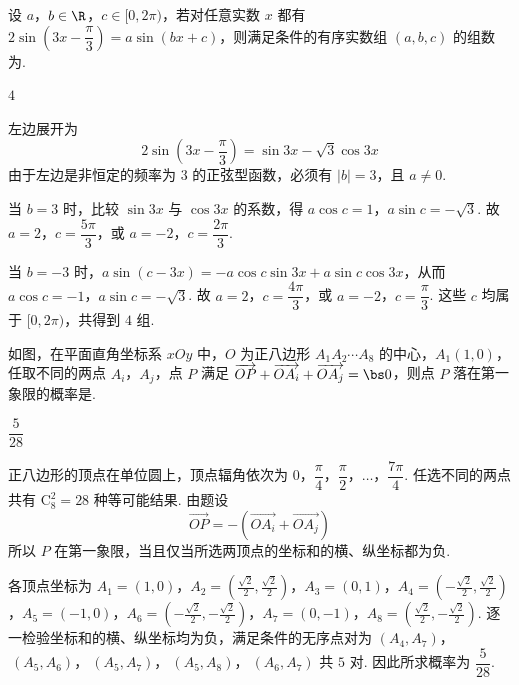 \begin{problem}
设 \(a\)，\(b\in\R\)，\(c\in[0,2\pi)\)，若对任意实数 \(x\) 都有 \(2\sin\!\left(3x-\dfrac{\pi}{3}\right)=a\sin(bx+c)\)，则满足条件的有序实数组 \((a,b,c)\) 的组数为\fillinblank{}.
\end{problem}

\begin{answer}
\(4\)
\end{answer}

\begin{solution}
左边展开为
\[
2\sin\left(3x-\frac\pi3\right)=\sin3x-\sqrt3\cos3x
\]
由于左边是非恒定的频率为 \(3\) 的正弦型函数，必须有 \(|b|=3\)，且 \(a\ne0\).

当 \(b=3\) 时，比较 \(\sin3x\) 与 \(\cos3x\) 的系数，得
\(a\cos c=1\)，\(a\sin c=-\sqrt3\).
故 \(a=2\)，\(c=\dfrac{5\pi}{3}\)，或 \(a=-2\)，\(c=\dfrac{2\pi}{3}\).

当 \(b=-3\) 时，\(a\sin(c-3x)=-a\cos c\sin3x+a\sin c\cos3x\)，从而
\(a\cos c=-1\)，\(a\sin c=-\sqrt3\).
故 \(a=2\)，\(c=\dfrac{4\pi}{3}\)，或 \(a=-2\)，\(c=\dfrac\pi3\). 这些 \(c\) 均属于 \([0,2\pi)\)，共得到 \(4\) 组.
\end{solution}

\begin{problem}
如图，在平面直角坐标系 \(xOy\) 中，\(O\) 为正八边形 \(A_1A_2\cdots A_8\) 的中心，\(A_1(1,0)\)，任取不同的两点 \(A_i\)，\(A_j\)，点 \(P\) 满足 \(\overrightarrow{OP}+\overrightarrow{OA_i}+\overrightarrow{OA_j}=\bs0\)，则点 \(P\) 落在第一象限的概率是\fillinblank{}.

\end{problem}

\begin{answer}
\(\dfrac5{28}\)
\end{answer}

\begin{solution}
正八边形的顶点在单位圆上，顶点辐角依次为 \(0\)，\(\dfrac\pi4\)，\(\dfrac\pi2\)，\(\ldots\)，\(\dfrac{7\pi}4\). 任选不同的两点共有 \(\mathrm C_8^2=28\) 种等可能结果. 由题设
\[
\overrightarrow{OP}=-\left(\overrightarrow{OA_i}+\overrightarrow{OA_j}\right)
\]
所以 \(P\) 在第一象限，当且仅当所选两顶点的坐标和的横、纵坐标都为负.

各顶点坐标为 \(A_1=(1,0)\)，\(A_2=(\frac{\sqrt2}{2},\frac{\sqrt2}{2})\)，\(A_3=(0,1)\)，\(A_4=(-\frac{\sqrt2}{2},\frac{\sqrt2}{2})\)，\(A_5=(-1,0)\)，\(A_6=(-\frac{\sqrt2}{2},-\frac{\sqrt2}{2})\)，\(A_7=(0,-1)\)，\(A_8=(\frac{\sqrt2}{2},-\frac{\sqrt2}{2})\). 逐一检验坐标和的横、纵坐标均为负，满足条件的无序点对为
\((A_4,A_7)\)，\(\ (A_5,A_6)\)，\(\ (A_5,A_7)\)，\(\ (A_5,A_8)\)，\(\ (A_6,A_7)\)
共 \(5\) 对. 因此所求概率为 \(\dfrac5{28}\).
\end{solution}

